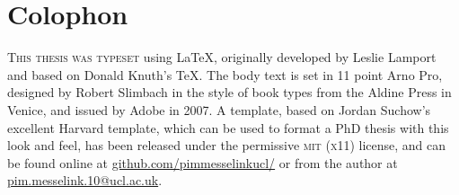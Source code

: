 \chapter*{Colophon}

\begin{center}
\parbox{200pt}{\raggedright\lettrine[lines=3,slope=-2pt,nindent=-4pt]{\textcolor{NavyBlue}{T}}{his thesis was typeset} using \LaTeX, originally developed by Leslie Lamport and based on Donald Knuth's \TeX. The body text is set in 11 point Arno Pro, designed by Robert Slimbach in the style of book types from the Aldine Press in Venice, and issued by Adobe in 2007. A template, based on Jordan Suchow's excellent Harvard template, which can be used to format a PhD thesis with this look and feel, has been released under the permissive \textsc{mit} (\textsc{x}11) license, and can be found online at \href{https://github.com/pimmesselinkucl/}{github.com/pimmesselinkucl/} or from the author at \href{mailto:pim.messelink.10@ucl.ac.uk}{pim.messelink.10@ucl.ac.uk}.
}
\end{center}